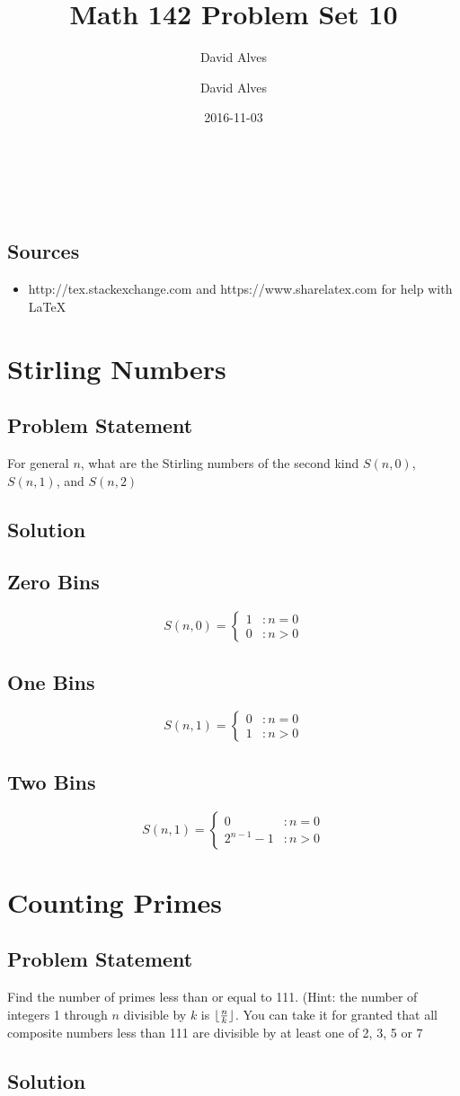 \documentclass[12pt]{article}
\author{David Alves}
\title{Math 142 Problem Set 10}
\author{David Alves}
\date{2016-11-03}
\DeclarePairedDelimiter\floor{\lfloor}{\rfloor}
\newcommand{\ProblemStatement}[1]{
\subsection*{Problem Statement}
#1
\subsection*{Solution}
}
\begin{document}

\begin{center}
\large \thetitle \\
\theauthor \\
\thedate
\end{center}

\subsection*{Sources}

    \begin{itemize}
    \item http://tex.stackexchange.com and https://www.sharelatex.com for help with \LaTeX
    \end{itemize}

\section{Stirling Numbers}
\ProblemStatement{
For general $n$, what are the Stirling numbers of the second kind $S(n,0)$, $S(n,1)$, and $S(n,2)$
}

\subsection{Zero Bins}
\[
    S(n, 0) = 
    \begin{cases}
        1&: n=0\\
        0&: n>0    
    \end{cases}
\]
\subsection{One Bins}
\[
    S(n, 1) = 
    \begin{cases}
        0&: n=0\\
        1&: n>0    
    \end{cases}
\]


\subsection{Two Bins}
\[
    S(n, 1) = 
    \begin{cases}
        0&: n=0\\
        2^{n-1}-1&: n>0    
    \end{cases}
\]

\section{Counting Primes}
\ProblemStatement{
Find the number of primes less than or equal to 111. (Hint: the number of integers 1 through $n$ divisible by $k$ is $\floor{\frac{n}{k}}$. You can take it for granted that all composite numbers less than 111 are divisible by at least one of 2, 3, 5 or 7
}
\end{document}
